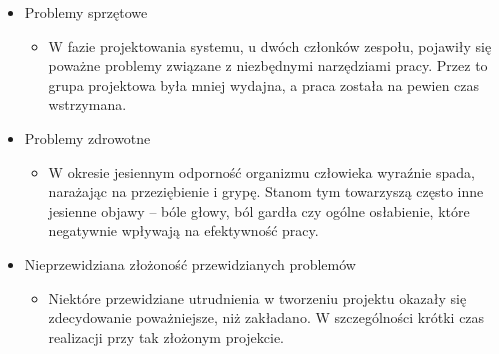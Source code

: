 \begin{itemize}
	\item Problemy sprzętowe
	\begin{itemize}
		\item W fazie projektowania systemu, u dwóch członków zespołu, pojawiły się poważne problemy związane z niezbędnymi narzędziami pracy. Przez to grupa projektowa była mniej wydajna, a praca została na pewien czas wstrzymana. 
	\end{itemize}
	\item Problemy zdrowotne
	\begin{itemize}
		\item W okresie jesiennym odporność organizmu człowieka wyraźnie spada, narażając na przeziębienie i grypę. Stanom tym towarzyszą często inne jesienne objawy – bóle głowy, ból gardła czy ogólne osłabienie, które negatywnie wpływają na efektywność pracy.
	\end{itemize}
	\item Nieprzewidziana złożoność przewidzianych problemów
	\begin{itemize}
		\item Niektóre przewidziane utrudnienia w tworzeniu projektu okazały się zdecydowanie poważniejsze, niż zakładano. W szczególności krótki czas realizacji przy tak złożonym projekcie.
	\end{itemize}
\end{itemize}
